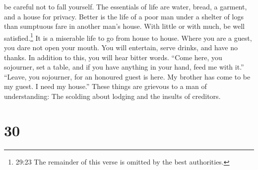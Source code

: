 be careful not to fall yourself.  The essentials of life
are water, bread, a garment, and a house for privacy. 
Better is the life of a poor man under a shelter of logs than sumptuous
fare in another man's house.  With little or with much, be
well satisfied.\footnote{29:23 The remainder of this verse is omitted by
  the best authorities.}  It is a miserable life to go from
house to house. Where you are a guest, you dare not open your mouth.
 You will entertain, serve drinks, and have no thanks. In
addition to this, you will hear bitter words.  ``Come here,
you sojourner, set a table, and if you have anything in your hand, feed
me with it.''  ``Leave, you sojourner, for an honoured
guest is here. My brother has come to be my guest. I need my house.''
 These things are grievous to a man of understanding: The
scolding about lodging and the insults of creditors.

\hypertarget{section-25}{%
\section{30}\label{section-25}}

